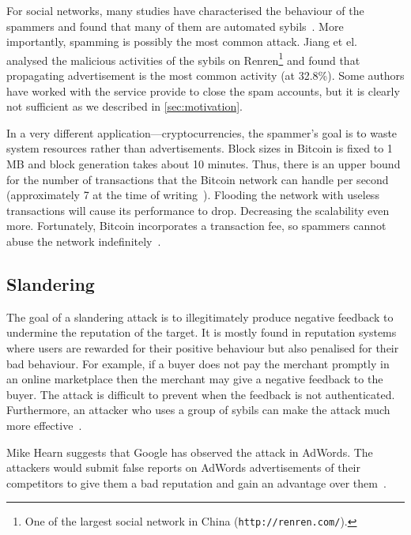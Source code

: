 For social networks, many studies have characterised the behaviour of the
spammers and found that many of them are automated
sybils~\cite{stringhini2010detecting, yang2012analyzing, grier2010spam,
  jiang2015understanding}. More importantly, spamming is possibly the most
common attack. Jiang et el.~\cite{jiang2015understanding} analysed the malicious
activities of the sybils on Renren\footnote{One of the largest social network in
  China (\texttt{http://renren.com/}).} and found that propagating advertisement
is the most common activity (at 32.8\%). Some authors have worked with the
service provide to close the spam accounts, but it is clearly not sufficient as
we described in \autoref{sec:motivation}.

In a very different application---cryptocurrencies, the spammer's goal is to
waste system resources rather than advertisements. Block sizes in Bitcoin is
fixed to 1 MB and block generation takes about 10 minutes. Thus, there is an
upper bound for the number of transactions that the Bitcoin network can handle
per second (approximately 7 at the time of writing~\cite{bitcointps}). Flooding
the network with useless transactions will cause its performance to drop.
Decreasing the scalability even more. Fortunately, Bitcoin incorporates a
transaction fee, so spammers cannot abuse the network
indefinitely~\cite{bitcoinspam}.


\subsection{Slandering}
The goal of a slandering attack is to illegitimately produce negative feedback
to undermine the reputation of the target. It is mostly found in reputation
systems where users are rewarded for their positive behaviour but also penalised
for their bad behaviour. For example, if a buyer does not pay the merchant
promptly in an online marketplace then the merchant may give a negative feedback
to the buyer. The attack is difficult to prevent when the feedback is not
authenticated. Furthermore, an attacker who uses a group of sybils can make the
attack much more effective~\cite{hoffman2009survey}.

Mike Hearn suggests that Google has observed the attack in AdWords. The
attackers would submit false reports on AdWords advertisements of their
competitors to give them a bad reputation and gain an advantage over
them~\cite{adwords}.

